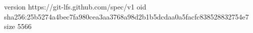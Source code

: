 version https://git-lfs.github.com/spec/v1
oid sha256:25b5274a4bec7fa980cea3aa3768a98d2b1b5dcdaa0a5facfc838528832754e7
size 5566
